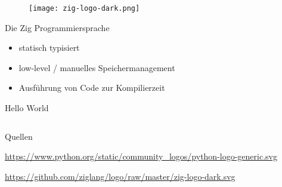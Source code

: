 \documentclass[aspectratio=169]{beamer}
\begin{document}
\begin{frame}{}
  \begin{figure}
    \centering
    \texttt{[image: zig-logo-dark.png]}
    \caption{\cite{zig_logo}}
    \label{fig:zig_logo}
  \end{figure}
\end{frame}

\begin{frame}{Die Zig Programmiersprache}
  \begin{itemize}
  \item statisch typisiert
  \item low-level / manuelles Speichermanagement
  \item Ausführung von Code zur Kompilierzeit
  \end{itemize}
\end{frame}

\begin{frame}{Hello World}
  \inputminted[linenos]{zig}{examples/hello.zig}
\end{frame}

\begin{frame}{Quellen}
  \begin{thebibliography}{}
    \url{https://www.python.org/static/community_logos/python-logo-generic.svg}

    \url{https://github.com/ziglang/logo/raw/master/zig-logo-dark.svg}

  \end{thebibliography}
\end{frame}
\end{document}
